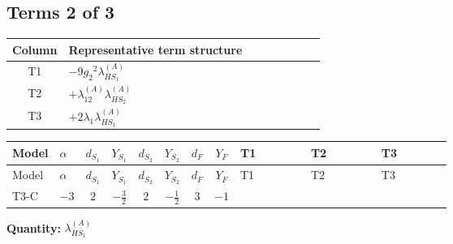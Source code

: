 \documentclass[8pt]{article}
\begin{document}
\begin{landscape}
\subsection*{Terms 2 of 3}
\begin{center}
\begin{tabular}{@{}c >{\raggedright\arraybackslash}p{0.82\linewidth}@{}}
\toprule
Column & Representative term structure \\
\midrule
T1 & \(\displaystyle -9 {g_2}^2 {\lambda_{HS_1}^{(A)}}\) \\
\midrule
T2 & \(\displaystyle +{\lambda_{12}^{(A)}} {\lambda_{HS_2}^{(A)}}\) \\
\midrule
T3 & \(\displaystyle +2 {\lambda_1} {\lambda_{HS_1}^{(A)}}\) \\
\midrule
\bottomrule
\end{tabular}
\end{center}
\smallskip
\tiny
\begin{longtable}{@{}llcccccc >{\raggedright\arraybackslash}p{0.21\linewidth} >{\raggedright\arraybackslash}p{0.21\linewidth} >{\raggedright\arraybackslash}p{0.21\linewidth}@{}}
\toprule
Model & $\alpha$ & $d_{S_1}$ & $Y_{S_1}$ & $d_{S_2}$ & $Y_{S_2}$ & $d_F$ & $Y_F$ & T1 & T2 & T3 \\
\midrule
\endfirsthead
\toprule
Model & $\alpha$ & $d_{S_1}$ & $Y_{S_1}$ & $d_{S_2}$ & $Y_{S_2}$ & $d_F$ & $Y_F$ & T1 & T2 & T3 \\
\midrule
\endhead
T3-C & $-3$ & $2$ & $-\frac{3}{2}$ & $2$ & $-\frac{1}{2}$ & $3$ & $-1$ & \scriptsize\adjustbox{max width=\linewidth}{$\begin{gathered} -9 {g_2}^2 {\lambda_{HS_1}^{(A)}}\end{gathered}$} & \scriptsize\adjustbox{max width=\linewidth}{$\begin{gathered} +{\lambda_{12}^{(A)}} {\lambda_{HS_2}^{(A)}}\end{gathered}$} & \scriptsize\adjustbox{max width=\linewidth}{$\begin{gathered} +2 {\lambda_1} {\lambda_{HS_1}^{(A)}}\end{gathered}$} \\
\midrule
\bottomrule
\end{longtable}
\clearpage
\noindent\textbf{Quantity: }$\lambda_{HS_1}^{(A)}$\par\smallskip

\end{landscape}
\end{document}
